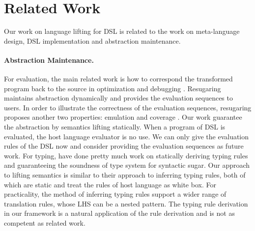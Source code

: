 \section{Related Work}

Our work on language lifting for DSL is related to the work on meta-language design, DSL implementation and abstraction maintenance.

\paragraph{Abstraction Maintenance.}
For evaluation, the main related work is how to correspond the transformed program back to the source in optimization and debugging \cite{resugar,abs-1,abs-2,abs-3}.
Resugaring maintains abstraction dynamically and provides the evaluation sequences to users.
In order to illustrate the correctness of the evaluation sequences, resugaring proposes another two properties: emulation and coverage \cite{resugar}.
Our work guarantee the abstraction by semantics lifting statically.
When a program of DSL is evaluated, the host language evaluator is no use.
We can only give the evaluation rules of the DSL now and 
 consider providing the evaluation sequences as future work.
For typing, \cite{infer-types,type-sound,type-sound-1} have done pretty much work on statically deriving typing rules and guaranteeing the soundness of type system for syntactic sugar.
Our approach to lifting semantics is similar to their approach to inferring typing rules,
 both of which are static and treat the rules of host language as white box.
For practicality, the method of inferring typing rules support a wider range of translation rules,
 whose LHS can be a nested pattern.
The typing rule derivation in our framework is a natural application of the rule derivation
 and is not as competent as related work.

